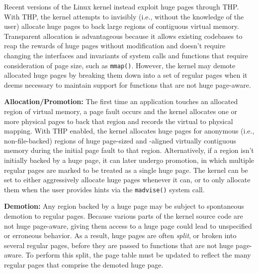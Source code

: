 Recent versions of the Linux kernel instead exploit huge pages through THP.
With THP, the kernel attempts to invisibly (i.e., without the knowledge of the
user) allocate huge pages to back large regions of contiguous virtual memory.
Transparent allocation is advantageous because it allows existing codebases to
reap the rewards of huge pages without modification and doesn't require changing
the interfaces and invariants of system calls and functions that require
consideration of page size, such as \texttt{mmap()}.  However, the kernel may
demote allocated huge pages by breaking them down into a set of regular pages
when it deems necessary  to maintain support for functions that are not huge
page-aware.

\textbf{Allocation/Promotion:} The first time an application touches an
allocated region of virtual memory, a page fault occurs and the kernel allocates
one or more physical pages to back that region and records the virtual to
physical mapping.  With THP enabled, the kernel allocates huge pages for
anonymous (i.e., non-file-backed) regions of huge page-sized and -aligned
virtually contiguous memory during the initial page fault to that region.
Alternatively, if a region isn't initially backed by a huge page, it can later
undergo promotion, in which multiple regular pages are marked to be treated as a
single huge page.  The kernel can be set to either aggressively allocate huge
pages whenever it can, or to only allocate them when the user provides hints via
the \texttt{madvise()} system call.

\textbf{Demotion:} Any region backed by a huge page may be subject to
spontaneous demotion to regular pages.  Because various parts of the kernel
source code are not huge page-aware, giving them access to a huge page could
lead to unspecified or erroneous behavior.  As a result, huge pages are often
\emph{split}, or broken into several regular pages, before they are passed to
functions that are not huge page-aware.  To perform this split, the page table
must be updated to reflect the many regular pages that comprise the demoted huge
page.


